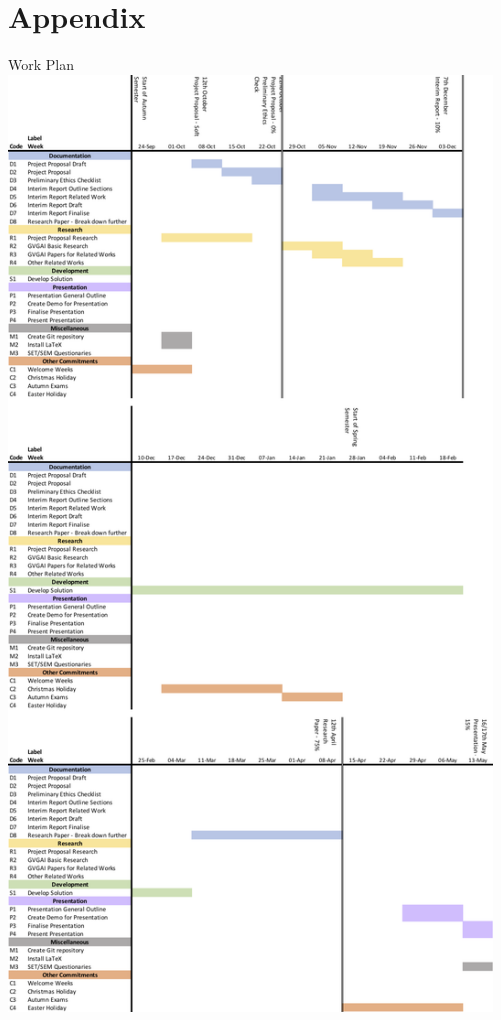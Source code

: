 \documentclass[a4paper]{article}
\begin{document}
\section{Appendix}



\clearpage
\begin{center}
    \Large{Work Plan}\\
\includegraphics[height=24.8cm]{workPlan.png}
\end{center}
\end{document}
